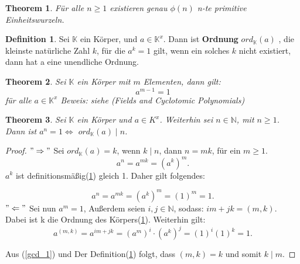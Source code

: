 \documentclass[12pt,oneside]{article}
\newtheorem{theorem}{Theorem}[section]
\theoremstyle{remark}
\theoremstyle{definition}
\newtheorem{definition}{Definition}[section]
\begin{document}
\smallskip

\begin{theorem}\label{num_of_prim_uni}
Für alle $n \geq 1$ existieren genau $\phi(n)$ n-te primitive Einheitswurzeln. 
\end{theorem}

\smallskip

\begin{definition}\label{ord_def}
Sei $\mathbb{K}$ ein Körper, und $a \in \mathbb{K}^x$. Dann ist \textbf{Ordnung} $ ord_{ \mathbb{K} }(a)$ , die kleinste natürliche Zahl $k$, für die $a^k = 1 $ gilt, wenn ein solches $k$ nicht existiert, dann hat a eine unendliche Ordnung. 
\end{definition}

\smallskip

\begin{theorem}
Sei $\mathbb{K}$ ein Körper mit $m$ Elementen, dann gilt:
\begin{equation}
    a^{m-1} = 1
\end{equation}
für alle $a \in \mathbb{K}^x$\newline
Beweis: siehe (Fields and Cyclotomic Polynomials) 
\end{theorem}

\smallskip

\begin{theorem}
Sei $\mathbb{K}$ ein Körper und $a \in K^x$. Weiterhin sei $ n \in \mathbb{N}$, mit $n \geq 1$. Dann ist $a^n = 1 \Leftrightarrow	 $ $ord_{\mathbb{K}}(a) \mid n$. 
\end{theorem}

\smallskip

\begin{proof}
$"\Rightarrow"$\newline
Sei $ord_{\mathbb{K}}(a) = k $, wenn $k \mid n$, dann $n = mk$, für ein $ m \geq 1$.
\begin{equation}
    a^n = a^{mk} = (a^k)^m. 
\end{equation}
$a^k$ ist definitionsmäßig(\ref{ord_def}) gleich 1. Daher gilt folgendes:

\begin{equation}
    a^n = a^{mk} = (a^k)^m = (1)^m = 1.
\end{equation}
$"\Leftarrow"$\newline
Sei nun $a^m = 1$, Außerdem seien $i,j \in \mathbb{N}$, sodass:\newline
$im + jk = (m,k)$. Dabei ist k die Ordnung des Körpers(\ref{ord_def}).\newline\newline
Weiterhin gilt: 
\begin{equation}\label{gcd_1}
   a^{(m,k)} = a^{im + jk} = (a^m)^i \cdot (a^k)^j = (1)^i (1)^k = 1.
\end{equation}

Aus (\ref{gcd_1}) und Der Definition(\ref{ord_def}) folgt, dass $(m,k) = k$ und somit $k \mid m$.
\end{proof}
\end{document}
